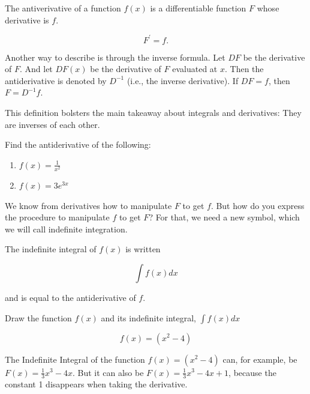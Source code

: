 \documentclass[]{book}
\providecommand{\tightlist}{%
  \setlength{\itemsep}{0pt}\setlength{\parskip}{0pt}}
\theoremstyle{definition}
\theoremstyle{definition}
\theoremstyle{definition}
\theoremstyle{remark}
\let\BeginKnitrBlock\begin \let\EndKnitrBlock\end
\begin{document}
\BeginKnitrBlock{definition}[Antiderivative]
\protect\hypertarget{def:unnamed-chunk-20}{}{\label{def:unnamed-chunk-20} {} }The antiverivative of a function \(f(x)\) is a differentiable function \(F\) whose derivative is \(f\).

\[F^\prime = f.\]
\EndKnitrBlock{definition}

Another way to describe is through the inverse formula. Let \(DF\) be the derivative of \(F\). And let \(DF(x)\) be the derivative of \(F\) evaluated at \(x\). Then the antiderivative is denoted by \(D^{-1}\) (i.e., the inverse derivative). If \(DF=f\), then \(F=D^{-1}f\).

This definition bolsters the main takeaway about integrals and derivatives: They are inverses of each other.

\BeginKnitrBlock{exercise}[Antiderivative]
\protect\hypertarget{exr:unnamed-chunk-21}{}{\label{exr:unnamed-chunk-21} {} }Find the antiderivative of the following:

\begin{enumerate}
\def\labelenumi{\arabic{enumi}.}
\tightlist
\item
  \(f(x) = \frac{1}{x^2}\)
\item
  \(f(x) = 3e^{3x}\)
\end{enumerate}
\EndKnitrBlock{exercise}

We know from derivatives how to manipulate \(F\) to get \(f\). But how do you express the procedure to manipulate \(f\) to get \(F\)? For that, we need a new symbol, which we will call indefinite integration.

\BeginKnitrBlock{definition}[Indefinite Integral]
\protect\hypertarget{def:unnamed-chunk-22}{}{\label{def:unnamed-chunk-22} {} }The indefinite integral of \(f(x)\) is written

\[\int f(x) dx \]

and is equal to the antiderivative of \(f\).
\EndKnitrBlock{definition}

\BeginKnitrBlock{example}
\protect\hypertarget{exm:unnamed-chunk-23}{}{\label{exm:unnamed-chunk-23} }Draw the function \(f(x)\) and its indefinite integral, \(\int\limits f(x) dx\)

\[f(x) = (x^2-4)\]
\EndKnitrBlock{example}

\BeginKnitrBlock{solution}
{}The Indefinite Integral of the function \(f(x) = (x^2-4)\) can, for example, be \(F(x) = \frac{1}{3}x^3 - 4x.\) But it can also be \(F(x) = \frac{1}{3}x^3 - 4x + 1\), because the constant 1 disappears when taking the derivative.
\EndKnitrBlock{solution}
\end{document}
